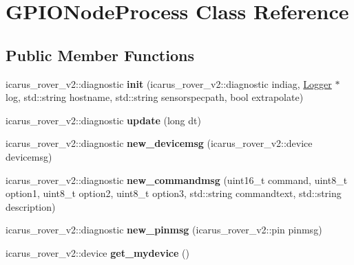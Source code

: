 \hypertarget{classGPIONodeProcess}{}\section{G\+P\+I\+O\+Node\+Process Class Reference}
\label{classGPIONodeProcess}
\subsection*{Public Member Functions}
\begin{DoxyCompactItemize}
\item 
\mbox{\label{classGPIONodeProcess_a6b1d548331e138f73ab9cef67ec56319}} 
icarus\+\_\+rover\+\_\+v2\+::diagnostic {\bfseries init} (icarus\+\_\+rover\+\_\+v2\+::diagnostic indiag, \hyperlink{classLogger}{Logger} $\ast$log, std\+::string hostname, std\+::string sensorspecpath, bool extrapolate)
\item 
\mbox{\label{classGPIONodeProcess_ac66c5f2749fc6c4c8425b0f553730b5f}} 
icarus\+\_\+rover\+\_\+v2\+::diagnostic {\bfseries update} (long dt)
\item 
\mbox{\label{classGPIONodeProcess_abc05069afa2e09de2a55e643d2db8eac}} 
icarus\+\_\+rover\+\_\+v2\+::diagnostic {\bfseries new\+\_\+devicemsg} (icarus\+\_\+rover\+\_\+v2\+::device devicemsg)
\item 
\mbox{\label{classGPIONodeProcess_a50b38b914d9ecb1930cd40012366254e}} 
icarus\+\_\+rover\+\_\+v2\+::diagnostic {\bfseries new\+\_\+commandmsg} (uint16\+\_\+t command, uint8\+\_\+t option1, uint8\+\_\+t option2, uint8\+\_\+t option3, std\+::string commandtext, std\+::string description)
\item 
\mbox{\label{classGPIONodeProcess_a59f8c09f80a1e24ff47f97699c5ee77c}} 
icarus\+\_\+rover\+\_\+v2\+::diagnostic {\bfseries new\+\_\+pinmsg} (icarus\+\_\+rover\+\_\+v2\+::pin pinmsg)
\item 
\mbox{\label{classGPIONodeProcess_a46b3783bd2d312f46937c454b2a88aef}} 
icarus\+\_\+rover\+\_\+v2\+::device {\bfseries get\+\_\+mydevice} ()
\item 
\mbox{\label{classGPIONodeProcess_ac88b1e74236c642fe54c12e4dc3e6a14}} 

\end{DoxyCompactItemize}
